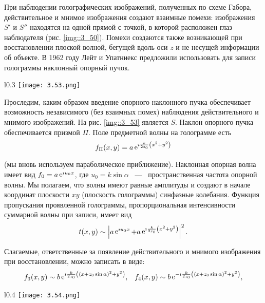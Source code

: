 При наблюдении голографических изображений, полученных по схеме Габора,
действительное и мнимое изображения создают взаимные помехи: изображения 
$S'$ и $S''$ находятся на одной прямой с точкой, в которой расположен глаз наблюдателя (рис. \ref{img::3_50}).
Помехи создаются также возникающей при восстановлении плоской волной, бегущей
вдоль оси $z$ и не несущей информации об объекте. В 1962 году Лейт и Упатниекс предложили использовать для записи голограммы наклонный опорный пучок.

\begin{wrapfigure}{l}{0.3\linewidth}
  \texttt{[image: 3.53.png]}
  \caption{Наклонный опорный пучок}
  \label{img::3_53}
\end{wrapfigure}

Проследим, каким образом введение опорного наклонного пучка обеспечивает 
возможность независимого (без взаимных помех) наблюдения действительного
и мнимого изображений. На рис. \ref{img::3_53}  является 
 $S$. Наклон опорного пучка обеспечивается призмой
$\Pi$. Поле предметной волны на голограмме есть
$$
f_{\Pi}(x, y) = a \mathop{\mathrm e}\nolimits^{\imath \frac{k}{2z_0}\left(x^2+y^2\right)}
$$

(мы вновь используем параболическое приближение). Наклонная опорная волна 
имеет вид $f_0 = a\mathop{\mathrm e}\nolimits^{\imath u_0x}$, где $u_0 = k \sin{\alpha}$ ~---~ 
пространственная частота опорной волны. Мы полагаем, что волны
имеют равные амплитуды и создают в начале координат плоскости $xy$
(плоскость голограммы) синфазные колебания. Функция пропускания
проявленной голограммы, пропорциональная интенсивности суммарной волны при 
записи, имеет вид
$$
t(x, y) \sim 
\left|
a\mathop{\mathrm e}\nolimits^{\imath u_0 x} + a \mathop{\mathrm e}\nolimits^{\imath \frac{k}{2z_0}\left(x^2+y^2\right)}
\right|^2 .
$$

Слагаемые, ответственные за появление действительного и мнимого изображения 
при восстановлении, можно записать в виде:
\begin{align*}
f_3(x, y) \sim
b \mathop{\mathrm e}\nolimits^{\imath \frac{k}{2z_0}
\left(
  \left(
    x + z_0 \sin{\alpha}
  \right)^2
  +y^2
\right)
}, &&
f_4(x, y) \sim
b \mathop{\mathrm e}\nolimits^{ -\imath \frac{k}{2z_0}
  \left(
  \left(
  x + z_0 \sin{\alpha}
  \right)^2
  +y^2
  \right)
},
\end{align*}

\begin{wrapfigure}{l}{0.4\linewidth}
  \texttt{[image: 3.54.png]}
  \caption{Мнимые и действительные изображения в схеме с наклонным пучком}
  \label{img::3_54}
\end{wrapfigure}

